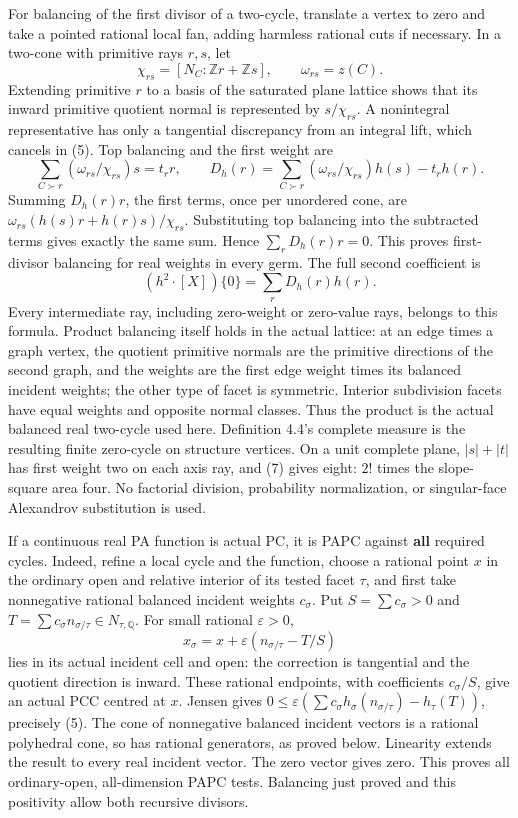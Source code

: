 \documentclass[
  11pt,
]{article}
\begin{document}
For balancing of the first divisor of a two-cycle, translate a vertex to
zero and take a pointed rational local fan, adding harmless rational
cuts if necessary. In a two-cone with primitive rays \(r,s\), let \[
 \chi_{rs}=[N_C:\mathbb{Z}r+\mathbb{Z}s],\qquad \omega_{rs}=z(C).
\] Extending primitive \(r\) to a basis of the saturated plane lattice
shows that its inward primitive quotient normal is represented by
\(s/\chi_{rs}\). A nonintegral representative has only a tangential
discrepancy from an integral lift, which cancels in (5). Top balancing
and the first weight are \[
 \sum_{C\succ r}(\omega_{rs}/\chi_{rs})s=t_r r,
 \qquad D_h(r)=\sum_{C\succ r}(\omega_{rs}/\chi_{rs})h(s)-t_rh(r). \tag{6}
\] Summing \(D_h(r)r\), the first terms, once per unordered cone, are
\(\omega_{rs}(h(s)r+h(r)s)/\chi_{rs}\). Substituting top balancing into
the subtracted terms gives exactly the same sum. Hence
\(\sum_rD_h(r)r=0\). This proves first-divisor balancing for real
weights in every germ. The full second coefficient is \[
                       (h^2\cdot[X])\{0\}=\sum_rD_h(r)h(r).     \tag{7}
\] Every intermediate ray, including zero-weight or zero-value rays,
belongs to this formula. Product balancing itself holds in the actual
lattice: at an edge times a graph vertex, the quotient primitive normals
are the primitive directions of the second graph, and the weights are
the first edge weight times its balanced incident weights; the other
type of facet is symmetric. Interior subdivision facets have equal
weights and opposite normal classes. Thus the product is the actual
balanced real two-cycle used here. Definition 4.4's complete measure is
the resulting finite zero-cycle on structure vertices. On a unit
complete plane, \(|s|+|t|\) has first weight two on each axis ray, and
(7) gives eight: \(2!\) times the slope-square area four. No factorial
division, probability normalization, or singular-face Alexandrov
substitution is used.

If a continuous real PA function is actual PC, it is PAPC against
\textbf{all} required cycles. Indeed, refine a local cycle and the
function, choose a rational point \(x\) in the ordinary open and
relative interior of its tested facet \(\tau\), and first take
nonnegative rational balanced incident weights \(c_\sigma\). Put
\(S=\sum c_\sigma>0\) and
\(T=\sum c_\sigma n_{\sigma/\tau}\in N_{\tau,\mathbb{Q}}\). For small
rational \(\varepsilon>0\), \[
 x_\sigma=x+\varepsilon(n_{\sigma/\tau}-T/S)
\] lies in its actual incident cell and open: the correction is
tangential and the quotient direction is inward. These rational
endpoints, with coefficients \(c_\sigma/S\), give an actual PCC centred
at \(x\). Jensen gives
\(0\leq\varepsilon(\sum c_\sigma h_\sigma(n_{\sigma/\tau})-h_\tau(T))\),
precisely (5). The cone of nonnegative balanced incident vectors is a
rational polyhedral cone, so has rational generators, as proved below.
Linearity extends the result to every real incident vector. The zero
vector gives zero. This proves all ordinary-open, all-dimension PAPC
tests. Balancing just proved and this positivity allow both recursive
divisors.
\end{document}
